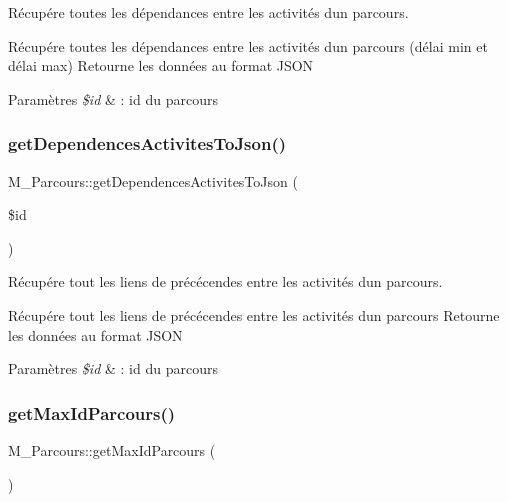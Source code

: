 Récupére toutes les dépendances entre les activités d\textquotesingle{}un parcours. 

Récupére toutes les dépendances entre les activités d\textquotesingle{}un parcours (délai min et délai max) Retourne les données au format J\+S\+ON 
\begin{DoxyParams}{Paramètres}
{\em \$id} & \+: id du parcours \\
\hline
\end{DoxyParams}
\mbox{\label{class_m___parcours_a4dee8684553fce58a3797b4dcd8461ed}} 
\subsubsection{\texorpdfstring{get\+Dependences\+Activites\+To\+Json()}{getDependencesActivitesToJson()}}
{\footnotesize\ttfamily M\+\_\+\+Parcours\+::get\+Dependences\+Activites\+To\+Json (\begin{DoxyParamCaption}\item[{}]{\$id }\end{DoxyParamCaption})}



Récupére tout les liens de précécendes entre les activités d\textquotesingle{}un parcours. 

Récupére tout les liens de précécendes entre les activités d\textquotesingle{}un parcours Retourne les données au format J\+S\+ON 
\begin{DoxyParams}{Paramètres}
{\em \$id} & \+: id du parcours \\
\hline
\end{DoxyParams}
\mbox{\label{class_m___parcours_a3a7e638bb3d1fbfd4e8bbeb8627b0e71}} 
\subsubsection{\texorpdfstring{get\+Max\+Id\+Parcours()}{getMaxIdParcours()}}
{\footnotesize\ttfamily M\+\_\+\+Parcours\+::get\+Max\+Id\+Parcours (\begin{DoxyParamCaption}{ }\end{DoxyParamCaption})}




